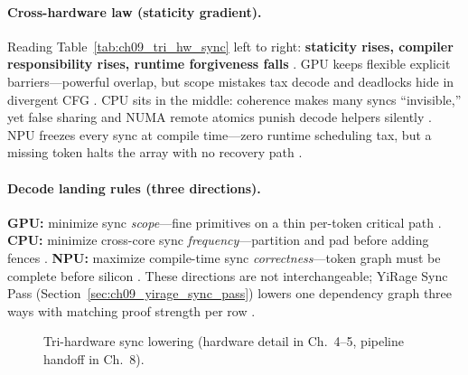 \paragraph{Cross-hardware law (staticity gradient).}
Reading Table~\ref{tab:ch09_tri_hw_sync} left to right: \textbf{staticity rises, compiler responsibility rises, runtime forgiveness falls} \citep{yirage2026,amd2024xdna,nvidia2022hopper}.
GPU keeps flexible explicit barriers---powerful overlap, but scope mistakes tax decode and deadlocks hide in divergent CFG \citep{shah2024flashattention3,patel2025llminference,taxbreak2026}.
CPU sits in the middle: coherence makes many syncs ``invisible,'' yet false sharing and NUMA remote atomics punish decode helpers silently \citep{dlbook,memoryfloor2026,chen2020compilerbasedhardw}.
NPU freezes every sync at compile time---zero runtime scheduling tax, but a missing token halts the array with no recovery path \citep{amd2024xdna,amd2024aie,yirage2026}.

\paragraph{Decode landing rules (three directions).}
\textbf{GPU:} minimize sync \emph{scope}---fine primitives on a thin per-token critical path \citep{semianalysis2024tma,shah2024flashattention3}.
\textbf{CPU:} minimize cross-core sync \emph{frequency}---partition and pad before adding fences \citep{patel2025llminference,dlbook}.
\textbf{NPU:} maximize compile-time sync \emph{correctness}---token graph must be complete before silicon \citep{amd2024aie,wu2024mirage}.
These directions are not interchangeable; YiRage Sync Pass (Section~\ref{sec:ch09_yirage_sync_pass}) lowers one dependency graph three ways with matching proof strength per row \citep{yirage2026,chen2020compilerbasedhardw,mpk2025}.

\begin{figure}[t]
\centering
{}
\caption{Tri-hardware sync lowering (hardware detail in Ch.~4--5, pipeline handoff in Ch.~8).}
\label{fig:hardware_sync_pick_architecture}
\end{figure}

